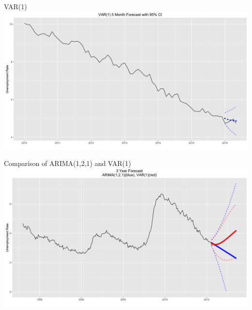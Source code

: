 \documentclass[ignorenonframetext]{beamer}
\begin{document}
  	\begin{frame}{VAR(1) }
  		 \includegraphics[width=\linewidth]{images/varpred}
  	\end{frame}
 
  	\begin{frame}{Comparison of ARIMA(1,2,1) and VAR(1) }
  		 \includegraphics[width=\linewidth]{images/arimavarforecast}
  	\end{frame}
 
\end{document}

